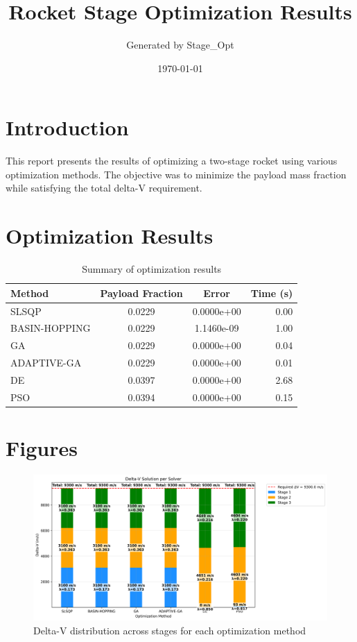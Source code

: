 \documentclass{article}
\title{Rocket Stage Optimization Results}
\author{Generated by Stage\_Opt}
\date{\today}
\begin{document}
\maketitle

\section{Introduction}
This report presents the results of optimizing a two-stage rocket using various optimization methods. The objective was to minimize the payload mass fraction while satisfying the total delta-V requirement.

\section{Optimization Results}
\begin{table}[H]
\centering
\begin{tabular}{lccr}
\toprule
Method & Payload Fraction & Error & Time (s) \\
\midrule
SLSQP & 0.0229 & 0.0000e+00 & 0.00 \\
BASIN-HOPPING & 0.0229 & 1.1460e-09 & 1.00 \\
GA & 0.0229 & 0.0000e+00 & 0.04 \\
ADAPTIVE-GA & 0.0229 & 0.0000e+00 & 0.01 \\
DE & 0.0397 & 0.0000e+00 & 2.68 \\
PSO & 0.0394 & 0.0000e+00 & 0.15 \\
\bottomrule
\end{tabular}
\caption{Summary of optimization results}
\label{tab:results}
\end{table}

\section{Figures}
\begin{figure}[H]
\centering
\includegraphics[width=\textwidth]{dv_breakdown.png}
\caption{Delta-V distribution across stages for each optimization method}
\label{fig:dv-breakdown}
\end{figure}
\end{document}
